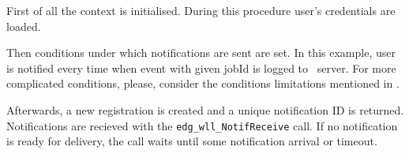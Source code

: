 First of all the context is initialised. During this procedure user's credentials are loaded. %

Then conditions under which notifications are sent are set. In this example, user is notified every time when event with given jobId is logged to \LB\ server. For more complicated conditions, please, consider the conditions limitations mentioned in \cite{lbug}.

Afterwards, a new registration is created and a unique notification ID is
returned.
Notifications are recieved with the \verb'edg_wll_NotifReceive' call.
If no notification is ready for
delivery, the call waits until some notification arrival or timeout.


